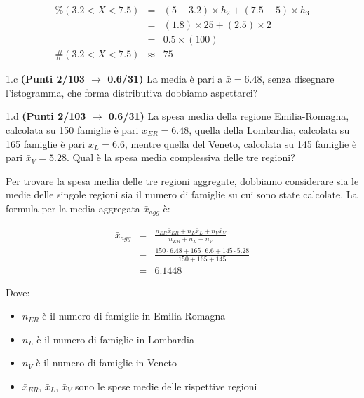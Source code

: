 \documentclass[
  11pt,
]{book}
\providecommand{\tightlist}{%
  \setlength{\itemsep}{0pt}\setlength{\parskip}{0pt}}
\theoremstyle{mytheoremstyle}
\theoremstyle{mydefstyle}
\newenvironment{sol}
  {
  \begin{tcolorbox}[enhanced,breakable,arc=0.1mm,boxrule=1pt,colback=white,colframe=iblue,
  title=\bf \fontfamily{lmss}\selectfont \hspace{.5 cm} Soluzione,drop fuzzy shadow]

}{
\end{tcolorbox}
  }
\begin{document}
\begin{sol}
\begin{eqnarray*} \%(3.2<X<7.5) &=& (5-3.2)\times h_{2}+  (7.5-5)\times h_{3}  \\ 
 &=& (1.8)\times 25+  (2.5)\times 2  \\ 
 &=&  0.5 \times(100)\\
     \#( 3.2 < X < 7.5 ) &\approx& 75 
         \end{eqnarray*}

\end{sol}

1.c \textbf{(Punti 2/103 \(\rightarrow\) 0.6/31)} La media è pari a \(\bar x=6.48\), senza disegnare l'istogramma, che forma distributiva dobbiamo aspettarci?

1.d \textbf{(Punti 2/103 \(\rightarrow\) 0.6/31)} La spesa media della regione Emilia-Romagna, calcolata su 150 famiglie è pari \(\bar x_{ER}=6.48\), quella della Lombardia, calcolata su 165 famiglie è pari \(\bar x_{L}=6.6\), mentre quella del Veneto, calcolata su 145 famiglie è pari \(\bar x_{V}=5.28\). Qual è la spesa media complessiva delle tre regioni?

\begin{sol}

Per trovare la spesa media delle tre regioni aggregate, dobbiamo considerare sia le medie delle singole regioni sia il numero di famiglie su cui sono state calcolate. La formula per la media aggregata \(\bar{x}_{agg}\) è:

\begin{eqnarray}
\bar{x}_{agg}    &=&  \frac{n_{ER} \bar{x}_{ER} + n_{L} \bar{x}_{L} + n_{V} \bar{x}_{V}}{n_{ER} + n_{L} + n_{V}}\\
&=& \frac{150\cdot6.48+165\cdot6.6+145\cdot5.28}{150+165+145}\\
&=& 6.1448
\end{eqnarray}

Dove:

\begin{itemize}
\tightlist
\item
  \(n_{ER}\) è il numero di famiglie in Emilia-Romagna
\item
  \(n_{L}\) è il numero di famiglie in Lombardia
\item
  \(n_{V}\) è il numero di famiglie in Veneto
\item
  \(\bar{x}_{ER}\), \(\bar{x}_{L}\), \(\bar{x}_{V}\) sono le spese medie delle rispettive regioni
\end{itemize}

\end{sol}
\end{document}
